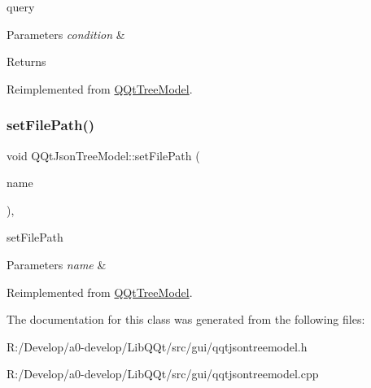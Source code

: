 query 


\begin{DoxyParams}{Parameters}
{\em condition} & \\
\hline
\end{DoxyParams}
\begin{DoxyReturn}{Returns}

\end{DoxyReturn}


Reimplemented from \mbox{\hyperlink{class_q_qt_tree_model_aacd492ce920be939d95d7e1bc2978cb1}{Q\+Qt\+Tree\+Model}}.

\mbox{\label{class_q_qt_json_tree_model_a5fe67b3b54a3f8c067fdb9ccdb84e553}} 
\subsubsection{\texorpdfstring{set\+File\+Path()}{setFilePath()}}
{\footnotesize\ttfamily void Q\+Qt\+Json\+Tree\+Model\+::set\+File\+Path (\begin{DoxyParamCaption}\item[{Q\+String}]{name }\end{DoxyParamCaption})\hspace{0.3cm}{\ttfamily [override]}, {\ttfamily [virtual]}}



set\+File\+Path 


\begin{DoxyParams}{Parameters}
{\em name} & \\
\hline
\end{DoxyParams}


Reimplemented from \mbox{\hyperlink{class_q_qt_tree_model_acfeea0d58fa29b1c34c1491f6a8f0b7c}{Q\+Qt\+Tree\+Model}}.



The documentation for this class was generated from the following files\+:\begin{DoxyCompactItemize}
\item 
R\+:/\+Develop/a0-\/develop/\+Lib\+Q\+Qt/src/gui/qqtjsontreemodel.\+h\item 
R\+:/\+Develop/a0-\/develop/\+Lib\+Q\+Qt/src/gui/qqtjsontreemodel.\+cpp\end{DoxyCompactItemize}
